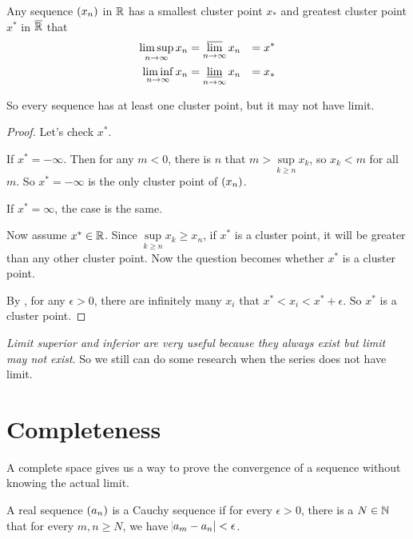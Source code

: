 \begin{theorem}
    Any sequence $\sequence{x_n}$ in $\mathbb{R}$ has a smallest cluster point $x_*$ and greatest cluster point $x^*$ in $\overline{\mathbb{R}}$ that
    \begin{equation}
        \begin{aligned}
            \limsup_{n \rightarrow \infty} x_n &= \varlimsup_{n\rightarrow \infty} x_n &= x^* \\
            \liminf_{n \rightarrow \infty} x_n &= \varliminf_{n\rightarrow \infty} x_n &= x_*
        \end{aligned}
    \end{equation}
    
    So every sequence has at least one cluster point, but it may not have limit.
\end{theorem}
\begin{proof}
    Let's check $x^*$. 
    
    If $x^* = - \infty$. Then for any $m < 0$, there is $n$ that $m > \underset{k \geq n}{\text{ sup }} x_k$, so $x_k < m$ for all $m$. So $x^* = -\infty$ is the only cluster point of $\sequence{x_n}$.
    
    If $x^* = \infty$, the case is the same.
        
    Now assume $x^* \in \mathbb{R}$. Since $\underset{k \geq n}{\text{ sup }} x_k \geq x_n$, if $x^*$ is a cluster point, it will be greater than any other cluster point. Now the question becomes whether $x^*$ is a cluster point. 
    
    By , for any $\epsilon>0$, there are infinitely many $x_i$ that $x^* < x_i < x^* + \epsilon$. So $x^*$ is a cluster point.
\end{proof}

\emph{Limit superior and inferior are very useful because they always exist but limit may not exist}. So we still can do some research when the series does not have limit.




\section{Completeness}

A complete space gives us a way to prove the convergence of a sequence without knowing the actual limit.

\begin{definition}
    A real sequence $\sequence{a_n}$ is a Cauchy sequence if for every $\epsilon > 0$, there is a $N \in \mathbb{N}$ that for every $m,n \geq N$, we have $\abs{a_m - a_n} < \epsilon$.
\end{definition}

